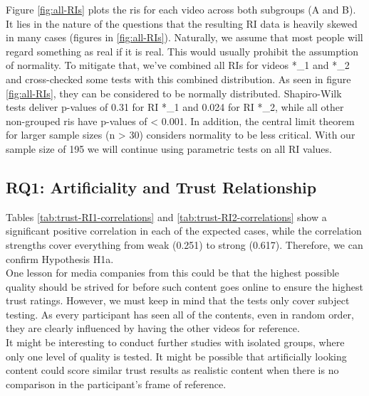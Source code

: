 \documentclass[
  a4paper,  %
  twoside,  %
  bibliography=totoc,
  headsepline,
  cleardoublepage=empty,
  parskip=half,
  draft=false
]{scrbook}
\begin{document}
Figure \ref{fig:all-RIs} plots the \gls{ri}s for each video across both subgroups (A and B). \\
It lies in the nature of the questions that the resulting RI data is heavily skewed in many cases (figures in \ref{fig:all-RIs}). Naturally, we assume that most people will regard something as real if it is real. This would usually prohibit the assumption of normality. To mitigate that, we've combined all RIs for videos *\_1 and *\_2 and cross-checked some tests with this combined distribution. As seen in figure \ref{fig:all-RIs}, they can be considered to be normally distributed. Shapiro-Wilk tests deliver p-values of 0.31 for RI *\_1 and 0.024 for RI *\_2, while all other non-grouped \gls{ri}s have p-values of < 0.001. In addition, the central limit theorem for larger sample sizes (n > 30) considers normality to be less critical. With our sample size of 195 we will continue using parametric tests on all RI values.

\subsection{RQ1: Artificiality and Trust Relationship}
\label{subsec:RQ1}

Tables \ref{tab:trust-RI1-correlations} and \ref{tab:trust-RI2-correlations} show a significant positive correlation in each of the expected cases, while the correlation strengths cover everything from weak (0.251) to strong (0.617). Therefore, we can confirm Hypothesis H1a. \\
One lesson for media companies from this could be that the highest possible quality should be strived for before such content goes online to ensure the highest trust ratings. However, we must keep in mind that the tests only cover subject testing. As every participant has seen all of the contents, even in random order, they are clearly influenced by having the other videos for reference. \\
It might be interesting to conduct further studies with isolated groups, where only one level of quality is tested. It might be possible that artificially looking content could score similar trust results as realistic content when there is no comparison in the participant's frame of reference.
\end{document}
